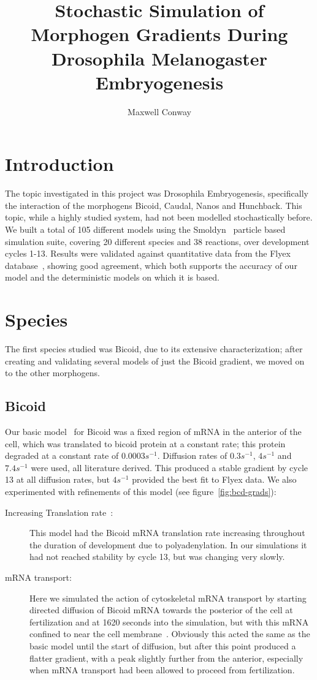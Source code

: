 \documentclass[11pt,a4paper,twocolumn]{article}
\begin{document}
\title{Stochastic Simulation of Morphogen Gradients During Drosophila Melanogaster Embryogenesis}
\author{Maxwell Conway}
\date{}
\maketitle
\section{Introduction}
The topic investigated in this project was Drosophila Embryogenesis, specifically the interaction of the morphogens Bicoid, Caudal, Nanos and Hunchback. This topic, while a highly studied system, had not been modelled stochastically before. We built a total of 105 different models using the Smoldyn~\cite{Andrews2010} particle based simulation suite, covering 20 different species and 38 reactions, over development cycles 1-13. Results were validated against quantitative data from the Flyex database~\cite{Pisarev2009}, showing good agreement, which both supports the accuracy of our model and the deterministic models on which it is based. 

\section{Species}
The first species studied was Bicoid, due to its extensive characterization; after creating and validating several models of just the Bicoid gradient, we moved on to the other morphogens.
\subsection{Bicoid}
Our basic model~\cite{Grimm2010} for Bicoid was a fixed region of mRNA in the anterior of the cell, which was translated to bicoid protein at a constant rate; this protein degraded at a constant rate of \(0.0003s^{-1}\). Diffusion rates of \(0.3s^{-1}\), \(4s^{-1}\) and \(7.4s^{-1}\) were used, all literature derived. This produced a stable gradient by cycle 13 at all diffusion rates, but  \(4s^{-1}\) provided the best fit to Flyex data.  We also experimented with refinements of this model (see figure~\ref{fig:bcd-grads}):
\begin{description}
\item[Increasing Translation rate~\cite{Holloway2011}:]
This model had the Bicoid mRNA translation rate increasing throughout the duration of development due to polyadenylation. In our simulations it had not reached stability by cycle 13, but was changing very slowly.
\item[mRNA transport:]
Here we simulated the action of cytoskeletal mRNA transport by starting directed diffusion of Bicoid mRNA towards the posterior of the cell at fertilization and at 1620 seconds into the simulation, but with this mRNA confined to near the cell membrane~\cite{Spirov2009}. Obviously this acted the same as the basic model until the start of diffusion, but after this point produced a flatter gradient, with a peak slightly further from the anterior, especially when mRNA transport had been allowed to proceed from fertilization.
\end{description}
\end{document}
